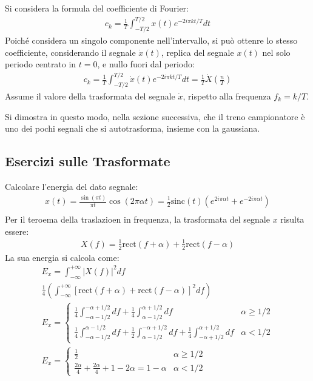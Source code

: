 \documentclass{article}
\numberwithin{equation}{subsection}
\begin{document}
Si considera la formula del coefficiente di Fourier:
\begin{gather*}
    c_k=\frac{1}{T}\displaystyle\int_{-T/2}^{T/2}x(t)e^{-2i\pi kt/T}dt
\end{gather*}
Poiché considera un singolo componente nell'intervallo, si può ottenre lo stesso coefficiente, considerando il segnale $\dot x(t)$, replica del segnale $x(t)$ nel solo periodo 
centrato in $t=0$, e nullo fuori dal periodo:
\begin{gather*}
    c_k=\frac{1}{T}\displaystyle\int_{-T/2}^{T/2}\dot x(t)e^{-2i\pi kt/T}dt=\frac{1}{T}\dot X\left(\frac{n}{T}\right)
\end{gather*}
Assume il valore della trasformata del segnale $\dot x$, rispetto alla frequenza $f_k=k/T$. 

Si dimostra in questo modo, nella sezione successiva, che il treno campionatore è uno dei pochi segnali che si autotrasforma, insieme con la gaussiana. 

\subsection{Esercizi sulle Trasformate}

Calcolare l'energia del dato segnale:
\begin{gather*}
    x(t)=\displaystyle\frac{\sin(\pi t)}{\pi t}\cos(2\pi \alpha t)=\frac{1}{2}\mbox{sinc}(t)(e^{2i\pi\alpha t}+e^{-2i\pi\alpha t})\\
\end{gather*}
Per il teroema della traslazioen in frequenza, la trasformata del segnale $x$ risulta essere:
\begin{gather*}
    X(f)=\displaystyle\frac{1}{2}\mbox{rect}(f+\alpha)+\frac{1}{2}\mbox{rect}(f-\alpha)
\end{gather*}
La sua energia si calcola come:
\begin{gather*}
    E_x=\displaystyle\int_{-\infty}^{+\infty}|X(f)|^2df\\
    \displaystyle\frac{1}{4}\left(\int_{-\infty}^{+\infty}\left[\mbox{rect}(f+\alpha)+\mbox{rect}(f-\alpha)\right]^2df\right)\\
    E_x=\begin{cases}
        \displaystyle\frac{1}{4}\int_{-\alpha-1/2}^{-\alpha+1/2}df+\frac{1}{4}\int_{\alpha-1/2}^{\alpha+1/2}df& \alpha\geq1/2\\
        \displaystyle\frac{1}{4}\int_{-\alpha-1/2}^{\alpha-1/2}df+\frac{1}{2}\int_{\alpha-1/2}^{-\alpha+1/2}df+\frac{1}{4}\int_{-\alpha+1/2}^{\alpha+1/2}df&\alpha<1/2
    \end{cases}\\
    E_x=\begin{cases}
        \displaystyle\frac{1}{2}&\alpha\geq1/2\\
        \displaystyle\frac{2\alpha}{4}+\frac{2\alpha}{4}+1-2\alpha=1-\alpha&\alpha<1/2
    \end{cases}
\end{gather*}
\end{document}
